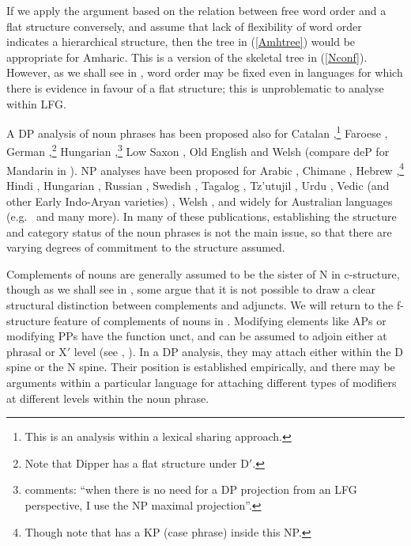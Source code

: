 \documentclass[output=paper,hidelinks]{langscibook}
\begin{document}
If we apply the argument based on the relation between free word order and a flat structure conversely, and assume that lack of flexibility of word order indicates a hierarchical structure, then the tree in (\ref{Amhtree}) would be appropriate for Amharic. This is a version of the skeletal tree in (\ref{Nconf}). However, as we shall see in , word order may be fixed even in languages for which there is evidence in favour of a flat structure; this is unproblematic to analyse within LFG.



A DP analysis of noun phrases has been proposed also for Catalan \citep{Alsina10},\footnote{This is an analysis within a lexical sharing approach.} Faroese \citep{Borjarsetal16}, German \citep{Dipper05},\footnote{Note that Dipper has a flat structure under D$'$.} Hungarian \citep{Laczko07, Laczko17},\footnote{\citet[250]{Laczko17} comments: ``when  there  is  no  need  for  a  DP  projection  from an LFG perspective, I use the NP maximal projection''.} Low Saxon \citep{Strunk05}, Old English \citep{Allen07} and Welsh \citep{MittSadl05} (compare deP for Mandarin in \citealt{Charters04}). NP analyses have been proposed for Arabic \citep{AlShaSadl09}, Chimane \citep{Ritchie16}, Hebrew \citep{Falk01actnom, Falk07, Spector09},\footnote{Though note that \citet{Falk01actnom} has a KP (case phrase) inside this NP.} Hindi \citep{Lee03}, Hungarian \citep{ChisaPayn01, ChisaPayn03}, Russian \citep{King95}, Swedish \citep{sellssao}, Tagalog \citep{Kroeger93}, Tz'utujil \citep{Duncan03}, Urdu \citep{BoBuSu08, RazaAhme11}, Vedic (and other Early Indo-Aryan varieties) \citep{Lowe17}, Welsh \citep{Sadler03, MittSadl08}, and widely for Australian languages (e.g.\ \citealt{Simpson1991, AustBres96, nordlinger1998constructive} and many more). In many of these publications, establishing the structure and category status of the noun phrases is not the main issue, so that there are varying degrees of commitment to the structure assumed.

Complements of nouns are generally assumed to be the sister of N in c-struc\-ture, though as we shall see in , some argue that it is not possible to draw a clear structural distinction between complements and adjuncts. We will return to the f-structure feature of complements of nouns in . Modifying elements like APs or modifying PPs have the function {\ADJ}unct,  and can be assumed to adjoin either at phrasal or X$'$ level (see \citealt[127]{BresnanEtAl2016}, \citealt[105--114]{ButtEtAl1999}). In a DP analysis, they may attach either within the D spine or the N spine. Their position is established empirically, and there may be arguments within a particular language for attaching different types of modifiers at different levels within the noun phrase.
\end{document}
